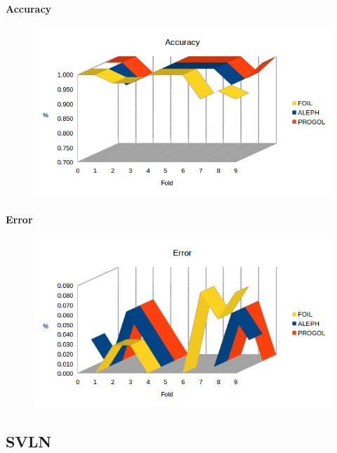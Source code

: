 \paragraph{Accuracy}
\begin{figure}[H]
	\includegraphics[width=1.1\textwidth]{img/datasetGraph/jmlr/accuracy.png}
	\label{JMLR-Accuracy}
\end{figure}

\paragraph{Error}
\begin{figure}[H]
	\includegraphics[width=1.1\textwidth]{img/datasetGraph/jmlr/error.png}
	\label{JMLR-Error}
\end{figure}


\subsection{SVLN}
